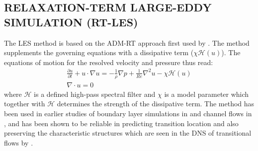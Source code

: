 \documentclass[twocolumn,10pt]{tsfp}
\begin{document}
\subsection*{RELAXATION-TERM LARGE-EDDY SIMULATION (RT-LES)}

The LES method is based on the ADM-RT approach first used by \cite{schlatter04}. The method supplements the governing equations with a dissipative term ($\chi\mathcal{H}(u)$). The equations of motion for the resolved velocity and pressure thus read:
\begin{eqnarray}
\frac{\partial u}{\partial t} + u\cdot\nabla u =  - \frac{1}{\rho}\nabla p + \frac{1}{Re}\nabla^{2}u -\chi\mathcal{H}(u) \\
\nabla\cdot u = 0
\end{eqnarray}
where $\mathcal{H}$ is a defined high-pass spectral filter and $\chi$ is a model parameter which together with $\mathcal{H}$ determines the strength of the dissipative term. The method has been used in earlier studies of boundary layer simulations in \cite{eitel14} and channel flows in \cite{schlatter06}, and has been shown to be reliable in predicting transition location and also preserving the characteristic structures which are seen in the DNS of transitional flows by \cite{schlatter06}.
\end{document}
